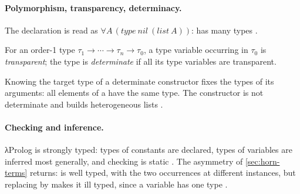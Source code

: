 \paragraph{Polymorphism, transparency, determinacy.} The declaration  is read as
$\forall A\,(\mathit{type}\ \mathit{nil}\ (\mathit{list}\ A))$:  has many types .
\begin{definition}
For an order-1 type $\tau_1\to\cdots\to\tau_n\to\tau_0$, a type variable occurring in $\tau_0$ is
\emph{transparent}; the type is \emph{determinate} if all its type variables are transparent.
\end{definition}
Knowing the target type of a determinate constructor fixes the types of its arguments: all elements of a
 have the same type. The constructor  is not determinate and
builds heterogeneous lists .

\paragraph{Checking and inference.} λProlog is strongly typed: types of constants are declared, types of
variables are inferred most generally, and checking is static . The asymmetry of
\cref{sec:horn-terms} returns:  is well
typed, with the two  occurrences at different instances, but replacing  by  makes it
ill typed, since a variable has one type .

